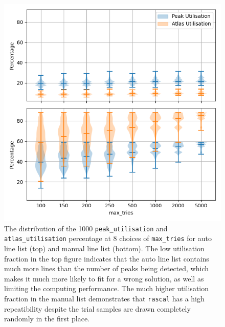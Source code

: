 \documentclass{aa}
\begin{document}
\begin{figure}[h]
    \centering
    \includegraphics[width=\columnwidth]{plots/figure_3_peak_atlas_utilisation.png}
    \caption{The distribution of the 1000 \texttt{peak\_utilisation} and
    \texttt{atlas\_utilisation} percentage at 8 choices of \texttt{max\_tries} for auto
    line list (top) and manual line list (bottom). The low utilisation fraction in the
    top figure indicates that the auto line list contains much more lines than the
    number of peaks being detected, which makes it much more likely to fit for a wrong
    solution, as well as limiting the computing performance. The much higher
    utilisation fraction in the manual list demonstrates that \texttt{rascal} has a
    high repeatibility despite the trial samples are drawn completely randomly in the
    first place.}
    \label{fig:peak_utilisation}
\end{figure}
\end{document}
